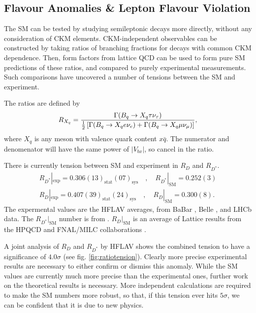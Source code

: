 \subsection{Flavour Anomalies \& Lepton Flavour Violation}

The SM can be tested by studying semileptonic decays more directly, without any consideration of CKM elements. CKM-independent observables can be constructed by taking ratios of branching fractions for decays with common CKM dependence. Then, form factors from lattice QCD can be used to form pure SM predictions of these ratios, and compared to purely experimental measurements. Such comparisons have uncovered a number of tensions between the SM and experiment.

The ratios are defined by
\begin{align}
  R_{X_q} = {\Gamma(B_q\to X_q \tau \nu_{\tau}) \over {1\over 2}\left[\Gamma(B_q\to X_q e \nu_e) + \Gamma(B_q\to X_q \mu \nu_{\mu}) \right]},
  \label{eq:Rratios}
\end{align}
where $X_q$ is any meson with valence quark content $x\bar{q}$. The numerator and denomenator will have the same power of $|V_{bx}|$, so cancel in the ratio.

There is currently tension between SM and experiment in $R_D$ and $R_{D^*}$.
\begin{gather}
  R_{D^*}|_{\text{exp}} = 0.306(13)_{\text{stat}}(07)_{\text{sys}}\quad,\quad R_{D^*}|_{\text{SM}} = 0.252(3)
  \\
  R_D|_{\text{exp}} = 0.407(39)_{\text{stat}}(24)_{\text{sys}}\quad,\quad R_D|_{\text{SM}} = 0.300(8).
\end{gather}
The expermental values are the HFLAV averages, from BaBar \cite{Lees:2012xj,Lees:2013uzd}, Belle \cite{Huschle:2015rga,Sato:2016svk,Hirose:2016wfn,Hirose:2017dxl}, and LHCb \cite{Aaij:2015yra,Aaij:2017uff,Aaij:2017deq} data. The $R_{D^*}|_{\text{SM}}$ number is from \cite{Fajfer:2012vx}. $R_D|_{\text{SM}}$ is an average of Lattice results from the HPQCD \cite{Na:2015kha} and FNAL/MILC collaborations \cite{Lattice:2015rga}.

A joint analysis of $R_D$ and $R_{D^*}$ by HFLAV shows the combined tension to have a significance of $4.0\sigma$ (see fig. \ref{fig:ratiotension}). Clearly more precise experimental results are necessary to either confirm or dismiss this anomaly. While the SM values are currently much more precise than the experimental ones, further work on the theoretical results is necessary. More independent calculations are required to make the SM numbers more robust, so that, if this tension ever hits $5\sigma$, we can be confident that it is due to new physics.


